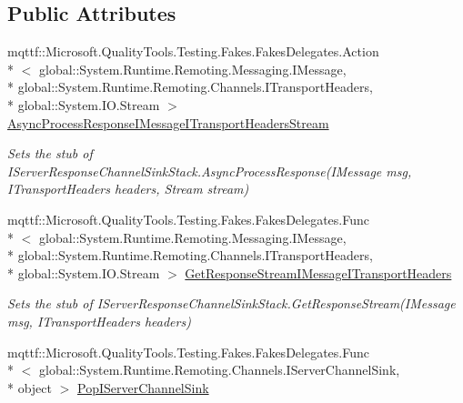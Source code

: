 \subsection*{Public Attributes}
\begin{DoxyCompactItemize}
\item 
mqttf\-::\-Microsoft.\-Quality\-Tools.\-Testing.\-Fakes.\-Fakes\-Delegates.\-Action\\*
$<$ global\-::\-System.\-Runtime.\-Remoting.\-Messaging.\-I\-Message, \\*
global\-::\-System.\-Runtime.\-Remoting.\-Channels.\-I\-Transport\-Headers, \\*
global\-::\-System.\-I\-O.\-Stream $>$ \hyperlink{class_system_1_1_runtime_1_1_remoting_1_1_channels_1_1_fakes_1_1_stub_i_server_channel_sink_stack_a697b1cb920d7baef005690c3f9bff9d5}{Async\-Process\-Response\-I\-Message\-I\-Transport\-Headers\-Stream}
\begin{DoxyCompactList}\small\item\em Sets the stub of I\-Server\-Response\-Channel\-Sink\-Stack.\-Async\-Process\-Response(\-I\-Message msg, I\-Transport\-Headers headers, Stream stream)\end{DoxyCompactList}\item 
mqttf\-::\-Microsoft.\-Quality\-Tools.\-Testing.\-Fakes.\-Fakes\-Delegates.\-Func\\*
$<$ global\-::\-System.\-Runtime.\-Remoting.\-Messaging.\-I\-Message, \\*
global\-::\-System.\-Runtime.\-Remoting.\-Channels.\-I\-Transport\-Headers, \\*
global\-::\-System.\-I\-O.\-Stream $>$ \hyperlink{class_system_1_1_runtime_1_1_remoting_1_1_channels_1_1_fakes_1_1_stub_i_server_channel_sink_stack_a876477edd1c0cbc4d6cbd0b6a008a76c}{Get\-Response\-Stream\-I\-Message\-I\-Transport\-Headers}
\begin{DoxyCompactList}\small\item\em Sets the stub of I\-Server\-Response\-Channel\-Sink\-Stack.\-Get\-Response\-Stream(\-I\-Message msg, I\-Transport\-Headers headers)\end{DoxyCompactList}\item 
mqttf\-::\-Microsoft.\-Quality\-Tools.\-Testing.\-Fakes.\-Fakes\-Delegates.\-Func\\*
$<$ global\-::\-System.\-Runtime.\-Remoting.\-Channels.\-I\-Server\-Channel\-Sink, \\*
object $>$ \hyperlink{class_system_1_1_runtime_1_1_remoting_1_1_channels_1_1_fakes_1_1_stub_i_server_channel_sink_stack_a0c630752e2c633caeb8b7d4e373dc7f0}{Pop\-I\-Server\-Channel\-Sink}

\end{DoxyCompactItemize}
